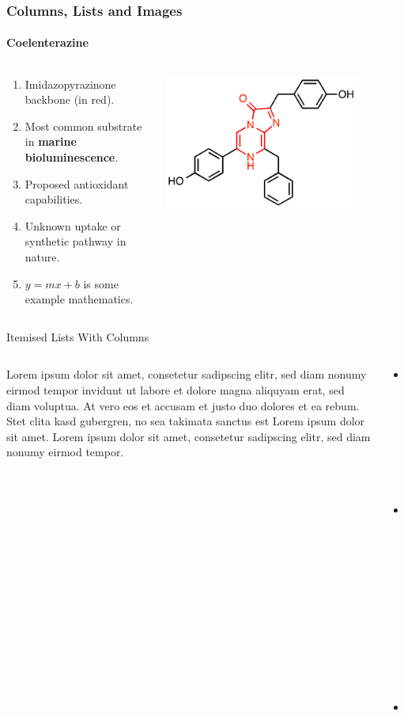 \documentclass[aspectratio=169]{beamer}
\begin{document}
\begin{frame}
   \frametitle{Columns, Lists and Images}
   \framesubtitle{Coelenterazine}
   \begin{columns}
      \begin{column}{0.5\textwidth}
         \begin{enumerate}
            \item Imidazopyrazinone backbone (in red).
            \item Most common substrate in \textbf{marine bioluminescence}.
            \item Proposed antioxidant capabilities.
            \item Unknown uptake or synthetic pathway in nature.
            \item $y=mx+b$ is some example mathematics.
         \end{enumerate}
      \end{column}
      \begin{column}{0.5\textwidth}
         \centering
         \includegraphics[width=0.8\textwidth]{coelenterazine.png}
      \end{column}
   \end{columns}
\end{frame}


\begin{frame}{Itemised Lists With Columns}
   \begin{columns}[T]
      \begin{column}{0.48\textwidth}
      Lorem ipsum dolor sit amet, consetetur sadipscing elitr, sed diam nonumy eirmod tempor invidunt ut labore et dolore magna aliquyam erat, sed diam voluptua. At vero eos et accusam et justo duo dolores et ea rebum. Stet clita kasd gubergren, no sea takimata sanctus est Lorem ipsum dolor sit amet. Lorem ipsum dolor sit amet, consetetur sadipscing elitr, sed diam nonumy eirmod tempor.
      \end{column}
      \begin{column}{0.48\textwidth}
      \begin{itemize}
         \item One point
         \item Another point
         \item And a \alert{third}!
      \end{itemize}
      \end{column}
   \end{columns}
\end{frame}
\end{document}
